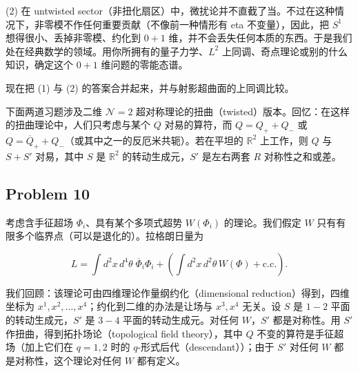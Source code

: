 
(2) 在 untwisted sector（非扭化扇区）中，微扰论并不直截了当。不过在这种情况下，非零模不作任何重要贡献（不像前一种情形有 eta 不变量），因此，把 $S^1$ 想得很小、丢掉非零模、约化到 $0+1$ 维，并不会丢失任何本质的东西。于是我们处在经典数学的领域。用你所拥有的量子力学、$L^2$ 上同调、奇点理论或别的什么知识，确定这个 $0+1$ 维问题的零能态谱。

现在把 (1) 与 (2) 的答案合并起来，并与射影超曲面的上同调比较。

下面两道习题涉及二维 $\mathcal{N}=2$ 超对称理论的扭曲（twisted）版本。回忆：在这样的扭曲理论中，人们只考虑与某个 $Q$ 对易的算符，而 $Q=Q_++Q_-$ 或 $Q=\overline{Q}_++Q_-$（或其中之一的反厄米共轭）。若在平坦的 $\mathbb{R}^2$ 上工作，则 $Q$ 与 $S+S'$ 对易，其中 $S$ 是 $\mathbb{R}^2$ 的转动生成元，$S'$ 是左右两套 $R$ 对称性之和或差。

\subsection*{Problem 10}

考虑含手征超场 $\Phi_i$、具有某个多项式超势 $W(\Phi_i)$ 的理论。我们假定 $W$ 只有有限多个临界点（可以是退化的）。拉格朗日量为

\begin{equation}
  \tag{9}
  \label{eq:ex-9}
  L=\int d^2x\,d^4\theta\;\overline{\Phi}_i\Phi_i+\left(\int d^2x\,d^2\theta\,W(\Phi)+\mathrm{c.c.}\right).
\end{equation}


我们回顾：该理论可由四维理论作量纲约化（dimensional reduction）得到，四维坐标为 $x^1,x^2,\dots,x^4$；约化到二维的办法是让场与 $x^3,x^4$ 无关。设 $S$ 是 $1-2$ 平面的转动生成元，$S'$ 是 $3-4$ 平面的转动生成元。对任何 $W$，$S'$ 都是对称性。用 $S'$ 作扭曲，得到拓扑场论（topological field theory），其中 $Q$ 不变的算符是手征超场（加上它们在 $q=1,2$ 时的 $q$-形式后代（descendant））；由于 $S'$ 对任何 $W$ 都是对称性，这个理论对任何 $W$ 都有定义。

